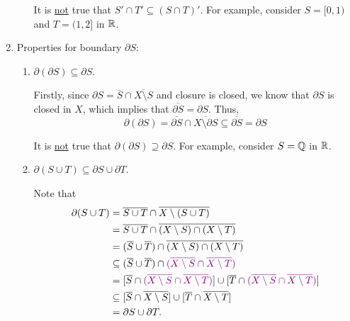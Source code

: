 \begin{enumerate}
\begin{enumerate}
\begin{warning}
It is \underline{not} true that \(S'\cap T'\subseteq (S\cap T)'\). For example, consider
\(S=[0,1)\) and \(T=(1,2]\) in \(\mathbb{R}\).
\end{warning}
\end{enumerate}

\item \label{it:bound-prop}
Properties for boundary \(\partial S\):
\begin{enumerate}
\item \(\partial(\partial S)\subseteq \partial S\).

\begin{pf}
Firstly, since \(\partial S=\overline{S}\cap\overline{X\setminus S}\) and
closure is closed, we know that \(\partial S\) is closed in \(X\), which
implies that \(\overline{\partial S}=\partial S\). Thus,
\[
\partial(\partial S)=\overline{\partial S}\cap\overline{X\setminus \partial S}
\subseteq \overline{\partial S}=\partial S
\]
\end{pf}

\begin{warning}
It is \underline{not} true that \(\partial(\partial S)\supseteq \partial S\). For example, consider
\(S=\mathbb{Q}\) in \(\mathbb{R}\).
\end{warning}
\item \(\partial(S\cup T)\subseteq \partial S\cup\partial T\).

\begin{pf}
Note that
\begin{align*}
\partial(S\cup T)
&=\overline{S\cup T}\cap\overline{X\setminus (S\cup T)}\\
&=\overline{S\cup T}\cap\overline{(X\setminus S)\cap (X\setminus T)}\\
&=(\overline{S}\cup\overline{T})\cap\overline{(X\setminus S)\cap (X\setminus T)}\\
&\subseteq (\overline{S}\cup\overline{T})\cap{\color{violet}(\overline{X\setminus S}\cap\overline{X\setminus T})}\\
&= [\overline{S}\cap{\color{violet}(\overline{X\setminus S}\cap\overline{X\setminus T})}]\cup
[\overline{T}\cap{\color{violet}(\overline{X\setminus S}\cap\overline{X\setminus T})}]\\
&\subseteq [\overline{S}\cap\overline{X\setminus S}]\cup
[\overline{T}\cap\overline{X\setminus T}]\\
&=\partial S\cup\partial T.
\end{align*}
\end{pf}


\end{enumerate}
\end{enumerate}
